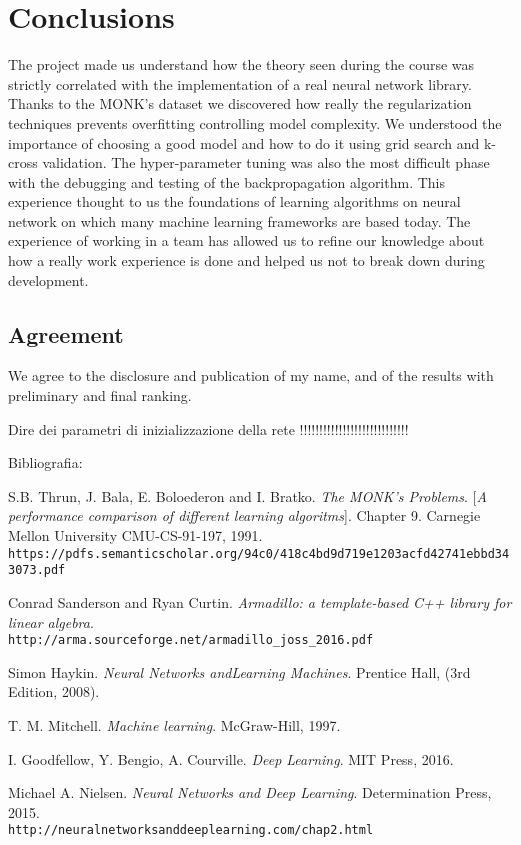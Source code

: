 \section{Conclusions}
The project made us understand how the theory seen during the course was strictly correlated with the implementation of a real neural network library. Thanks to the MONK's dataset we discovered how really the regularization techniques prevents overfitting controlling model complexity. We understood the importance of choosing a good model and how to do it using grid search and k-cross validation. The hyper-parameter tuning was also the most difficult phase with the debugging and testing of the backpropagation algorithm. This experience thought to us the foundations of learning algorithms on neural network on which many machine learning frameworks are based today. The experience of working in a team has allowed us to refine our knowledge about how a really work experience is done and helped us not to break down during development.
\subsection{Agreement}
We agree to the disclosure and publication of my name, and of the results with
preliminary and final ranking.

Dire dei parametri di inizializzazione della rete !!!!!!!!!!!!!!!!!!!!!!!!!!!!

Bibliografia:


\begin{thebibliography}{9}
	S.B. Thrun, J. Bala, E. Boloederon and I. Bratko.
	\textit{The MONK's Problems}. 
	[\textit{A performance comparison of different learning algoritms}]. Chapter 9.
	Carnegie Mellon University CMU-CS-91-197, 1991.
	\\\texttt{https://pdfs.semanticscholar.org/94c0/418c4bd9d719e1203acfd42741ebbd343073.pdf}
	
	Conrad Sanderson and Ryan Curtin. 
	\textit{Armadillo: a template-based C++ library for linear algebra}. 
	\\\texttt{http://arma.sourceforge.net/armadillo\_joss\_2016.pdf}

	
	Simon Haykin. 
	\textit{Neural Networks andLearning Machines}. 
	Prentice Hall, (3rd Edition, 2008).


	T. M. Mitchell. 
	\textit{Machine learning}. 
	McGraw-Hill, 1997.
	
	I. Goodfellow, Y. Bengio, A. Courville. 
	\textit{Deep Learning}. 
	MIT Press,  2016.
	
	Michael A. Nielsen. 
	\textit{Neural Networks and Deep Learning}. 
	Determination Press, 2015.
	\\\texttt{http://neuralnetworksanddeeplearning.com/chap2.html}
\end{thebibliography}



